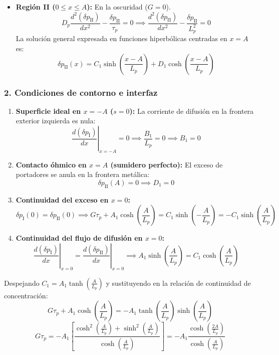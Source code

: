 \begin{problema}
\begin{itemize}
    \item \textbf{Región II ($0 \le x \le A$):} En la oscuridad ($G = 0$).
    \[
    D_p \frac{d^2(\delta p_{\text{II}})}{dx^2} - \frac{\delta p_{\text{II}}}{\tau_p} = 0 \implies \frac{d^2(\delta p_{\text{II}})}{dx^2} - \frac{\delta p_{\text{II}}}{L_p^2} = 0
    \]
    La solución general expresada en funciones hiperbólicas centradas en $x = A$ es:
    \[
    \delta p_{\text{II}}(x) = C_1 \sinh\left(\frac{x-A}{L_p}\right) + D_1 \cosh\left(\frac{x-A}{L_p}\right)
    \]
\end{itemize}

\subsubsection*{2. Condiciones de contorno e interfaz}
\begin{enumerate}
    \item \textbf{Superficie ideal en $x = -A$ ($s = 0$):} La corriente de difusión en la frontera exterior izquierda es nula:
    \[
    \left. \frac{d(\delta p_{\text{I}})}{dx} \right|_{x=-A} = 0 \implies \frac{B_1}{L_p} = 0 \implies B_1 = 0
    \]

    \item \textbf{Contacto óhmico en $x = A$ (sumidero perfecto):} El exceso de portadores se anula en la frontera metálica:
    \[
    \delta p_{\text{II}}(A) = 0 \implies D_1 = 0
    \]

    \item \textbf{Continuidad del exceso en $x = 0$:}
    \[
    \delta p_{\text{I}}(0) = \delta p_{\text{II}}(0) \implies G \tau_p + A_1 \cosh\left(\frac{A}{L_p}\right) = C_1 \sinh\left(-\frac{A}{L_p}\right) = -C_1 \sinh\left(\frac{A}{L_p}\right)
    \]

    \item \textbf{Continuidad del flujo de difusión en $x = 0$:}
    \[
    \left. \frac{d(\delta p_{\text{I}})}{dx} \right|_{x=0} = \left. \frac{d(\delta p_{\text{II}})}{dx} \right|_{x=0} \implies A_1 \sinh\left(\frac{A}{L_p}\right) = C_1 \cosh\left(\frac{A}{L_p}\right)
    \]
\end{enumerate}

Despejando $C_1 = A_1 \tanh\left(\frac{A}{L_p}\right)$ y sustituyendo en la relación de continuidad de concentración:
\[
G \tau_p + A_1 \cosh\left(\frac{A}{L_p}\right) = -A_1 \tanh\left(\frac{A}{L_p}\right) \sinh\left(\frac{A}{L_p}\right)
\]
\[
G \tau_p = -A_1 \left[ \frac{\cosh^2\left(\frac{A}{L_p}\right) + \sinh^2\left(\frac{A}{L_p}\right)}{\cosh\left(\frac{A}{L_p}\right)} \right] = -A_1 \frac{\cosh\left(\frac{2A}{L_p}\right)}{\cosh\left(\frac{A}{L_p}\right)}
\]


\end{problema}
